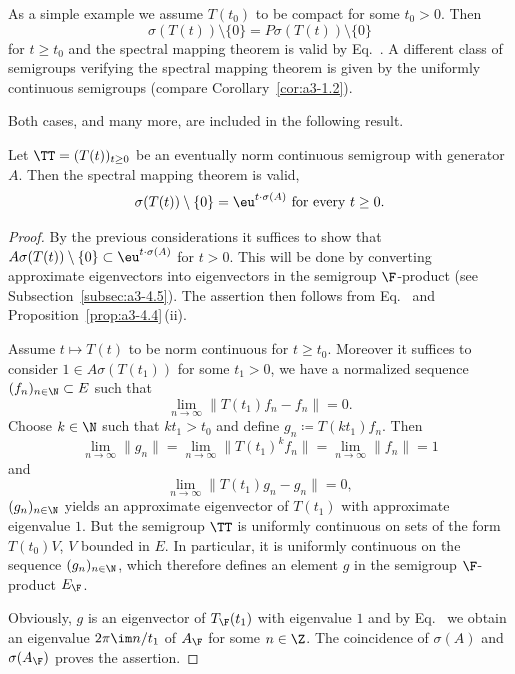 As a simple example we assume $T(t_{0})$ to be compact for some $t_{0} > 0$.
Then %
\[
	\sigma(T(t)) \setminus \{0\} = P\sigma(T(t)) \setminus \{0\}
\]
%
for $t \geq t_{0}$ and the spectral mapping theorem is valid by Eq.~.
A different class of semigroups verifying the spectral mapping theorem is given by the uniformly continuous semigroups (compare Corollary~\ref{cor:a3-1.2}).

Both cases, and many more, are included in the following result.
\begin{theorem}\label{thm:a3-6.6}%
Let $\TT = (T(t))_{t\geq 0}$ be an eventually norm continuous semigroup with generator $A$.
Then the spectral mapping theorem is valid, \ie 
\begin{equation}\label{eq:a3-6.6)}
	\sigma(T(t)) \setminus \{0\} = \eu^{t \cdot \sigma(A)} \text{ for every } t \geq 0 .
\end{equation}
\end{theorem}
\begin{proof}
By the previous considerations it suffices to show that $A\sigma(T(t)) \setminus \{0\} \subset \eu^{t \cdot \sigma(A)}$ for $t > 0$.
This will be done by converting approximate eigenvectors into eigenvectors in the semigroup $\F$-product (see Subsection~\ref{subsec:a3-4.5}).
The assertion then follows from Eq.~ and Proposition~\ref{prop:a3-4.4}\,(ii).

Assume $t \mapsto T(t)$ to be norm continuous for $t \geq t_{0}$.
Moreover it suffices to consider $1 \in A\sigma(T(t_{1}))$ for some $t_{1} > 0$, \ie we have a normalized sequence $(f_{n})_{n\in\N} \subset E$ such that
\[
\lim_{n\to\infty} \|T(t_{1})f_{n} - f_{n}\| = 0 .
\]
Choose $k \in \N$ such that $kt_{1} > t_{0}$ and define $g_{n} \coloneqq T(kt_{1})f_{n}$.
Then
\[
\lim_{n\to\infty}\|g_{n}\| = \lim_{n\to\infty}\|T(t_{1})^{k}f_{n}\| = \lim_{n\to\infty}\|f_{n}\| = 1
\]
and
\[
\lim_{n\to\infty} \|T(t_{1})g_{n} - g_{n}\| = 0 ,
\]
\ie $(g_{n})_{n\in\N}$ yields an approximate eigenvector 
of\/ $T(t_{1})$ with approximate eigenvalue $1$.
But the semigroup $\TT$ is uniformly continuous on sets of the form $T(t_{0})V$, $V$ bounded in $E$.
In particular, it is uniformly continuous on the sequence $(g_{n})_{n\in\N}$, which therefore defines an element $g$ in the semigroup $\F$-product $E_{\F}$.

Obviously, $g$ is an eigenvector of\/ $T_{\F}(t_{1})$ with eigenvalue $1$ and by Eq.~ we obtain an eigenvalue $2\pi\im  n/t_{1}$ of\/ $A_{\F}$ for some $n \in \Z$.
The coincidence of\/ $\sigma(A)$ and $\sigma(A_{\F})$ proves the assertion.
\end{proof}

